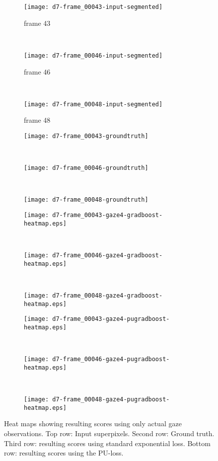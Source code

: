 \begin{figure}[ht]
	\centering
	\begin{subfigure}[h]{0.32\textwidth}
	\texttt{[image: d7-frame\_00043-input-segmented]}	
		\caption*{frame 43}
	\end{subfigure}
	~
	\begin{subfigure}[h]{0.32\textwidth}
	\texttt{[image: d7-frame\_00046-input-segmented]}	
		\caption*{frame 46}
	\end{subfigure}
	~
	\begin{subfigure}[h]{0.32\textwidth}
	\texttt{[image: d7-frame\_00048-input-segmented]}	
		\caption*{frame 48}
	\end{subfigure}
	
	\vspace{3mm}
	\begin{subfigure}[h]{0.32\textwidth}
	\texttt{[image: d7-frame\_00043-groundtruth]}	
	\end{subfigure}
	~
	\begin{subfigure}[h]{0.32\textwidth}
	\texttt{[image: d7-frame\_00046-groundtruth]}	
	\end{subfigure}
	~
	\begin{subfigure}[h]{0.32\textwidth}
	\texttt{[image: d7-frame\_00048-groundtruth]}	
	\end{subfigure}
	
	\vspace{3mm}
	\begin{subfigure}[h]{0.32\textwidth}
	\texttt{[image: d7-frame\_00043-gaze4-gradboost-heatmap.eps]}	
	\end{subfigure}
	~
	\begin{subfigure}[h]{0.32\textwidth}
	\texttt{[image: d7-frame\_00046-gaze4-gradboost-heatmap.eps]}
	\end{subfigure}
	~	
	\begin{subfigure}[h]{0.32\textwidth}
	\texttt{[image: d7-frame\_00048-gaze4-gradboost-heatmap.eps]}	
	\end{subfigure}
	
	\vspace{3mm}
	\begin{subfigure}[h]{0.32\textwidth}
	\texttt{[image: d7-frame\_00043-gaze4-pugradboost-heatmap.eps]}	
	\end{subfigure}
	~
	\begin{subfigure}[h]{0.32\textwidth}
	\texttt{[image: d7-frame\_00046-gaze4-pugradboost-heatmap.eps]}	
	\end{subfigure}
	~	
	\begin{subfigure}[h]{0.32\textwidth}
	\texttt{[image: d7-frame\_00048-gaze4-pugradboost-heatmap.eps]}	
	\end{subfigure}	
	
	\caption{Heat maps showing resulting scores using only actual gaze observations. Top row: Input superpixels. Second row: Ground truth. Third row: resulting scores using standard exponential loss. Bottom row: resulting scores using the PU-loss.}
	\label{fig:results-d7-gaze4}
\end{figure}

